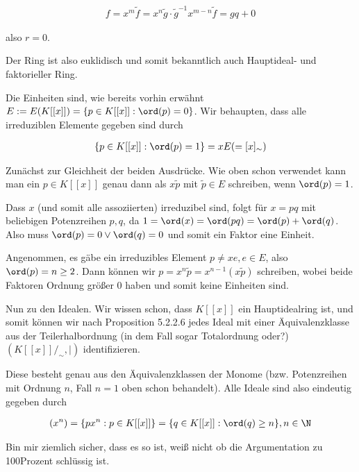 \begin{solution}
\begin{align*}
  f = x^m \tilde{f} = x^n\tilde{g} \cdot \tilde{g}^{-1}x^{m-n}\tilde{f} = gq + 0
\end{align*}

also $r = 0$.

Der Ring ist also euklidisch und somit bekanntlich auch Hauptideal- und faktorieller Ring.

Die Einheiten sind, wie bereits vorhin erwähnt $E := E(K[[x]]) = \{p \in K[[x]]: \ord(p) = 0\}$. Wir behaupten, dass alle irreduziblen Elemente gegeben sind durch

\begin{align*}
  \{p \in K[[x]]: \ord(p) = 1\} = xE ( = [x]_{\sim})
\end{align*}

Zunächst zur Gleichheit der beiden Ausdrücke. Wie oben schon verwendet kann man ein $p \in K[[x]]$ genau dann als $x\tilde{p}$ mit $\tilde{p} \in E$ schreiben, wenn $\ord(p) = 1$.

Dass $x$ (und somit alle assoziierten) irreduzibel sind, folgt für $x = pq$ mit beliebigen Potenzreihen $p,q$, da $1 = \ord(x) = \ord(pq) = \ord(p) + \ord(q)$. Also muss $\ord(p) = 0 \lor \ord(q) = 0$ und somit ein Faktor eine Einheit.

Angenommen, es gäbe ein irreduzibles Element $p \neq xe, e \in E$, also $\ord(p) = n \geq 2$. Dann können wir $p = x^n\tilde{p} = x^{n-1} (x\tilde{p})$ schreiben, wobei beide Faktoren Ordnung größer 0 haben und somit keine Einheiten sind.

Nun zu den Idealen. Wir wissen schon, dass $K[[x]]$ ein Hauptidealring ist, und somit können wir nach Proposition 5.2.2.6 jedes Ideal mit einer Äquivalenzklasse aus der Teilerhalbordnung (in dem Fall sogar Totalordnung oder?) $(K[[x]]/_{\sim},|)$ identifizieren.

Diese besteht genau aus den Äquivalenzklassen der Monome (bzw. Potenzreihen mit Ordnung $n$, Fall $n=1$ oben schon behandelt). Alle Ideale sind also eindeutig gegeben durch

\begin{align*}
  (x^n) = \{px^n: p \in K[[x]]\} = \{q \in K[[x]]: \ord(q) \geq n\}, n \in \N
\end{align*}

Bin mir ziemlich sicher, dass es so ist, weiß nicht ob die Argumentation zu 100Prozent schlüssig ist.


\end{solution}
